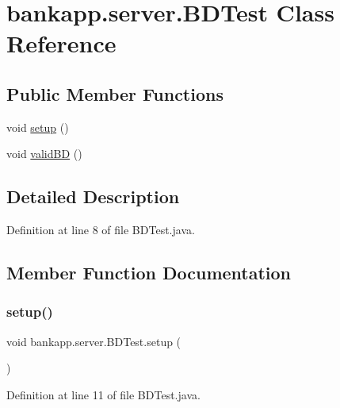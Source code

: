 \hypertarget{classbankapp_1_1server_1_1_b_d_test}{}\section{bankapp.\+server.\+B\+D\+Test Class Reference}
\label{classbankapp_1_1server_1_1_b_d_test}
\subsection*{Public Member Functions}
\begin{DoxyCompactItemize}
\item 
void \hyperlink{classbankapp_1_1server_1_1_b_d_test_a35da4c83723ff5395b80cd0b2a65bde3}{setup} ()
\item 
void \hyperlink{classbankapp_1_1server_1_1_b_d_test_a1f849eef20082450ec61a7a54fd50865}{valid\+BD} ()
\end{DoxyCompactItemize}


\subsection{Detailed Description}


Definition at line 8 of file B\+D\+Test.\+java.



\subsection{Member Function Documentation}
\mbox{\label{classbankapp_1_1server_1_1_b_d_test_a35da4c83723ff5395b80cd0b2a65bde3}} 
\subsubsection{\texorpdfstring{setup()}{setup()}}
{\footnotesize\ttfamily void bankapp.\+server.\+B\+D\+Test.\+setup (\begin{DoxyParamCaption}{ }\end{DoxyParamCaption})}



Definition at line 11 of file B\+D\+Test.\+java.

\mbox{\label{classbankapp_1_1server_1_1_b_d_test_a1f849eef20082450ec61a7a54fd50865}} 
